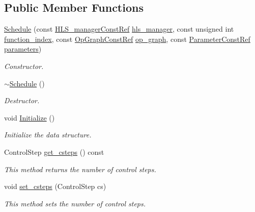 \subsection*{Public Member Functions}
\begin{DoxyCompactItemize}
\item 
\hyperlink{classSchedule_a245be13feb696aef57541ec19dcb5c5a}{Schedule} (const \hyperlink{hls__manager_8hpp_a1b481383e3beabc89bd7562ae672dd8c}{H\+L\+S\+\_\+manager\+Const\+Ref} \hyperlink{classSchedule_ac9335f00e46ddb07553a680243fab2b4}{hls\+\_\+manager}, const unsigned int \hyperlink{classSchedule_a51c826c36437ed5ec523725815cc25d0}{function\+\_\+index}, const \hyperlink{op__graph_8hpp_a9a0b240622c47584bee6951a6f5de746}{Op\+Graph\+Const\+Ref} \hyperlink{classSchedule_a3b416a5141bab0d0cca415dcc4e5c12d}{op\+\_\+graph}, const \hyperlink{Parameter_8hpp_a37841774a6fcb479b597fdf8955eb4ea}{Parameter\+Const\+Ref} \hyperlink{classSchedule_aceedbf18bb7e3a43b66df301ce21325f}{parameters})
\begin{DoxyCompactList}\small\item\em Constructor. \end{DoxyCompactList}\item 
\hyperlink{classSchedule_a4806b985197d35c00b9e707c0ed87998}{$\sim$\+Schedule} ()
\begin{DoxyCompactList}\small\item\em Destructor. \end{DoxyCompactList}\item 
void \hyperlink{classSchedule_ae081e822e8e894d32cb3a0e991c31889}{Initialize} ()
\begin{DoxyCompactList}\small\item\em Initialize the data structure. \end{DoxyCompactList}\item 
Control\+Step \hyperlink{classSchedule_a698a0718e0f7097c70a85d90d1f56e97}{get\+\_\+csteps} () const
\begin{DoxyCompactList}\small\item\em This method returns the number of control steps. \end{DoxyCompactList}\item 
void \hyperlink{classSchedule_ac54cd77d3f23af1c4ced5daed0aeef78}{set\+\_\+csteps} (Control\+Step cs)
\begin{DoxyCompactList}\small\item\em This method sets the number of control steps. \end{DoxyCompactList}\item 

\end{DoxyCompactItemize}
